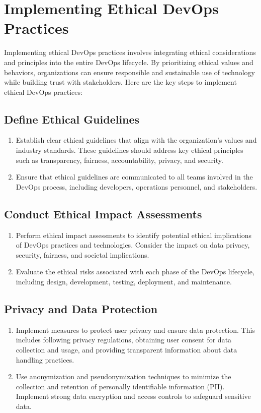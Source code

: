 \chapter*{Implementing Ethical DevOps Practices}

Implementing ethical DevOps practices involves integrating ethical considerations and principles into the entire DevOps lifecycle. By prioritizing ethical values and behaviors, organizations can ensure responsible and sustainable use of technology while building trust with stakeholders. Here are the key steps to implement ethical DevOps practices:

\section*{Define Ethical Guidelines}
\begin{enumerate}
    \item Establish clear ethical guidelines that align with the organization's values and industry standards. These guidelines should address key ethical principles such as transparency, fairness, accountability, privacy, and security.

    \item Ensure that ethical guidelines are communicated to all teams involved in the DevOps process, including developers, operations personnel, and stakeholders.
\end{enumerate}

\section*{Conduct Ethical Impact Assessments}
\begin{enumerate}
    \item Perform ethical impact assessments to identify potential ethical implications of DevOps practices and technologies. Consider the impact on data privacy, security, fairness, and societal implications.

    \item Evaluate the ethical risks associated with each phase of the DevOps lifecycle, including design, development, testing, deployment, and maintenance.
\end{enumerate}

\section*{Privacy and Data Protection}
\begin{enumerate}
    \item Implement measures to protect user privacy and ensure data protection. This includes following privacy regulations, obtaining user consent for data collection and usage, and providing transparent information about data handling practices.

    \item Use anonymization and pseudonymization techniques to minimize the collection and retention of personally identifiable information (PII). Implement strong data encryption and access controls to safeguard sensitive data.
\end{enumerate}

